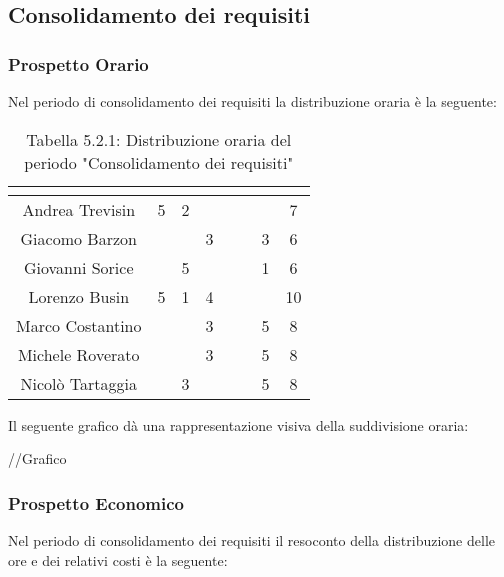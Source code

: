 \subsection{Consolidamento dei requisiti}

\subsubsection{Prospetto Orario}
Nel periodo di consolidamento dei requisiti la distribuzione oraria è la seguente:

\renewcommand{\arraystretch}{1.5}
\begin{table}[H]
\begin{center}
\begin{tabular}{|c|c|c|c|c|c|c|c|}
\hline
\rowcolor{title_row}
\textbf{\color{title_text}{Nome}} & \textbf{\color{title_text}{Resp.}} & \textbf{\color{title_text}{Ammi.}} & \textbf{\color{title_text}{Analist.}} & \textbf{\color{title_text}{Progett.}} & \textbf{\color{title_text}{Program.}} & \textbf{\color{title_text}{Verific.}} & \textbf{\color{title_text}{Totale}} \\ \hline
Andrea Trevisin  & 5 & 2 & & & & & 7 \\ \hline
Giacomo Barzon   & & & 3 & & & 3 & 6 \\ \hline
Giovanni Sorice  & & 5 & & & & 1 & 6 \\ \hline
Lorenzo Busin    & 5 & 1 & 4 & & & & 10 \\ \hline
Marco Costantino & & & 3 & & & 5 & 8 \\ \hline
Michele Roverato & & & 3 & & & 5 & 8 \\ \hline
Nicolò Tartaggia & & 3 & & & & 5 & 8 \\ \hline
\end{tabular}
\caption{Tabella 5.2.1: Distribuzione oraria del periodo "Consolidamento dei requisiti"\label{}}
\end{center}
\end{table}
\renewcommand{\arraystretch}{1}

Il seguente grafico dà una rappresentazione visiva della suddivisione oraria: \\
\begin{center}
//Grafico
\end{center}


\subsubsection{Prospetto Economico}
Nel periodo di consolidamento dei requisiti il resoconto della distribuzione delle ore e dei relativi costi è la seguente:

